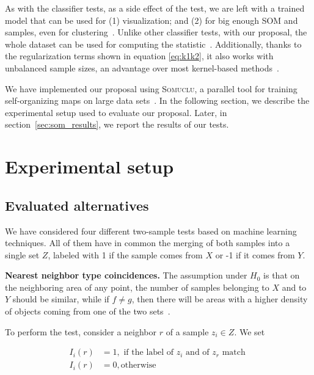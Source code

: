 As with the classifier tests, as a side effect of the test, we are left with a
trained model that can be used for (1) visualization; and (2) for big enough
\gls{SOM}  and samples, even for clustering~\cite{ultsch2005esom}.
Unlike other classifier tests, with our proposal, the whole dataset can be used
for computing the statistic~\cite{kirchler2020two}. Additionally, thanks to the
regularization terms shown in equation \ref{eq:k1k2}, it also works with
unbalanced sample sizes, an advantage over most kernel-based methods~\cite{song2021fast}.

We have implemented our proposal using \textsc{Somuclu}, a parallel
tool for training self-organizing maps on large data sets~\cite{wittek_somoclu_2017}.
In the following section, we describe the experimental setup used to
evaluate our proposal.
Later, in section~\ref{sec:som_results}, we report the results of our tests.

\section{Experimental setup}
\label{sec:som_exp_setup}

\subsection{Evaluated alternatives}

We have considered four different two-sample tests based on machine learning techniques.
All of them have in common the merging of both samples into a single set $Z$,
labeled with 1 if the sample comes from $X$ or -1 if it comes from $Y$.

\textbf{Nearest neighbor type coincidences.}
The assumption under $H_0$ is that on the neighboring area of any point, the number of samples
belonging to $X$ and to $Y$ should be similar, while if $f \neq g$, then there will be areas with
a higher density of objects coming from one of the two sets~\cite{Henze1988,Schilling1986b}.

To perform the test, consider a neighbor $r$ of a sample $z_i \in Z$. We set

\begin{equation}
\begin{split}
    I_i(r) &= 1, \textrm{ if the label of } z_i \textrm{ and of } z_r \textrm{ match }\\
    I_i(r) &= 0, \textrm{otherwise}
\end{split}
\end{equation}

